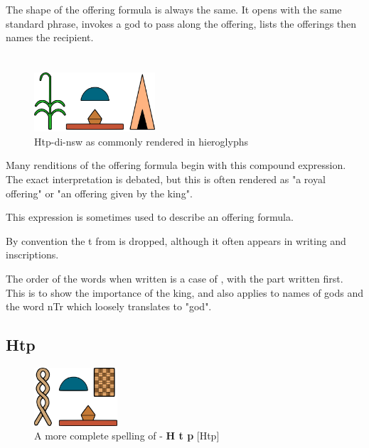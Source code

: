 The shape of the offering formula is always the same. It opens with the same standard phrase, invokes a god to pass along the offering, lists the offerings then names the recipient.

\section*{}

\begin{figure} [H]
	\centering
	\includegraphics[width=0.4\textwidth]{../images/htp-di-nsw}
	\caption{Htp-di-nsw as commonly rendered in hieroglyphs}
\end{figure}

Many renditions of the offering formula begin with this compound expression. The exact interpretation is debated, but this is often rendered as "a royal offering" or "an offering given by the king".

This expression is sometimes used to describe an offering formula.

By convention the t from  is dropped, although it often appears in writing and inscriptions.

The order of the words when written is a case of \textit{}, with the  part written first. This is to show the importance of the king, and also applies to names of gods and the word nTr which loosely translates to "god".

\subsection*{Htp}

\begin{figure} [H]
	\centering
	\includegraphics[width=0.275\textwidth]{../images/htp}
	\caption{A more complete spelling of  - \textbf{H t p} [Htp]}
\end{figure}

